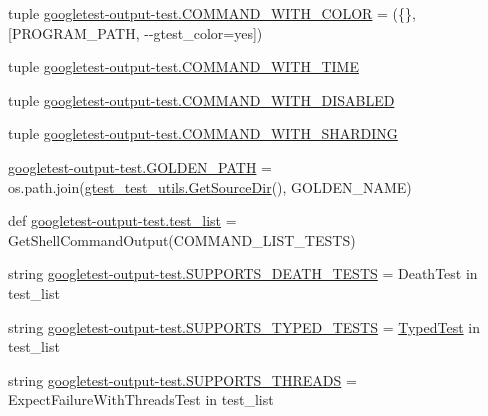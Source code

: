 \begin{DoxyCompactItemize}
\item 
tuple \mbox{\hyperlink{namespacegoogletest-output-test_ab4c3db724c6b581470a94b3118560a02}{googletest-\/output-\/test.\+C\+O\+M\+M\+A\+N\+D\+\_\+\+W\+I\+T\+H\+\_\+\+C\+O\+L\+OR}} = (\{\}, \mbox{[}P\+R\+O\+G\+R\+A\+M\+\_\+\+P\+A\+TH, \textquotesingle{}-\/-\/gtest\+\_\+color=yes\textquotesingle{}\mbox{]})
\item 
tuple \mbox{\hyperlink{namespacegoogletest-output-test_a748a138d54fa2c04f5ac4205ecc0e4e9}{googletest-\/output-\/test.\+C\+O\+M\+M\+A\+N\+D\+\_\+\+W\+I\+T\+H\+\_\+\+T\+I\+ME}}
\item 
tuple \mbox{\hyperlink{namespacegoogletest-output-test_a23aca1c76efbf8895d71a441c77a0225}{googletest-\/output-\/test.\+C\+O\+M\+M\+A\+N\+D\+\_\+\+W\+I\+T\+H\+\_\+\+D\+I\+S\+A\+B\+L\+ED}}
\item 
tuple \mbox{\hyperlink{namespacegoogletest-output-test_a7956407a07f884d3960e956ccb2571a6}{googletest-\/output-\/test.\+C\+O\+M\+M\+A\+N\+D\+\_\+\+W\+I\+T\+H\+\_\+\+S\+H\+A\+R\+D\+I\+NG}}
\item 
\mbox{\hyperlink{namespacegoogletest-output-test_aaf2c3cbfc15d83d986e1e2ba99a94a3e}{googletest-\/output-\/test.\+G\+O\+L\+D\+E\+N\+\_\+\+P\+A\+TH}} = os.\+path.\+join(\mbox{\hyperlink{namespacegtest__test__utils_aaff66cb0980804d8bd57dc719d4b5518}{gtest\+\_\+test\+\_\+utils.\+Get\+Source\+Dir}}(), G\+O\+L\+D\+E\+N\+\_\+\+N\+A\+ME)
\item 
def \mbox{\hyperlink{namespacegoogletest-output-test_aa116be76cb5d1da2469f2811706bf08e}{googletest-\/output-\/test.\+test\+\_\+list}} = Get\+Shell\+Command\+Output(C\+O\+M\+M\+A\+N\+D\+\_\+\+L\+I\+S\+T\+\_\+\+T\+E\+S\+TS)
\item 
string \mbox{\hyperlink{namespacegoogletest-output-test_a3df1558c443e0307fa5a68ec1a698850}{googletest-\/output-\/test.\+S\+U\+P\+P\+O\+R\+T\+S\+\_\+\+D\+E\+A\+T\+H\+\_\+\+T\+E\+S\+TS}} = \textquotesingle{}Death\+Test\textquotesingle{} in test\+\_\+list
\item 
string \mbox{\hyperlink{namespacegoogletest-output-test_a20362e86a65972b4ca1d030daabb0485}{googletest-\/output-\/test.\+S\+U\+P\+P\+O\+R\+T\+S\+\_\+\+T\+Y\+P\+E\+D\+\_\+\+T\+E\+S\+TS}} = \textquotesingle{}\mbox{\hyperlink{class_typed_test}{Typed\+Test}}\textquotesingle{} in test\+\_\+list
\item 
string \mbox{\hyperlink{namespacegoogletest-output-test_a9dd8b32109121ee9ce8a8c42130ca621}{googletest-\/output-\/test.\+S\+U\+P\+P\+O\+R\+T\+S\+\_\+\+T\+H\+R\+E\+A\+DS}} = \textquotesingle{}Expect\+Failure\+With\+Threads\+Test\textquotesingle{} in test\+\_\+list

\end{DoxyCompactItemize}
